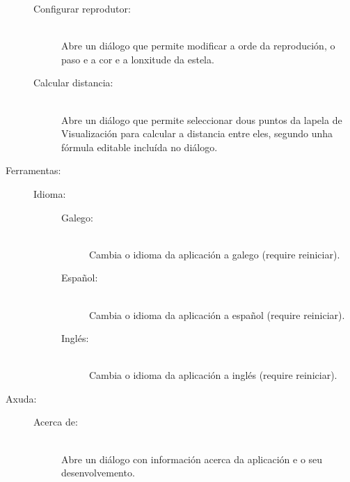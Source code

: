 \begin{description}
\begin{description}
\item[Configurar reprodutor:] \hfill \\
Abre un diálogo que permite modificar a orde da reprodución, o paso e a cor e a lonxitude da estela.

\item[Calcular distancia:] \hfill \\
Abre un diálogo que permite seleccionar dous puntos da lapela de Visualización para calcular a distancia entre eles, segundo unha fórmula editable incluída no diálogo.

\end{description}

\item[Ferramentas:] \hfill

\begin{description}

\item[Idioma:] \hfill

\begin{description}

\item[Galego:] \hfill \\
Cambia o idioma da aplicación a galego (require reiniciar).

\end{description}

\begin{description}

\item[Español:] \hfill \\
Cambia o idioma da aplicación a español (require reiniciar).

\end{description}

\begin{description}

\item[Inglés:] \hfill \\
Cambia o idioma da aplicación a inglés (require reiniciar).

\end{description}

\end{description}

\item[Axuda:] \hfill

\begin{description}

\item[Acerca de:] \hfill \\
Abre un diálogo con información acerca da aplicación e o seu desenvolvemento.

\end{description}

\end{description}

